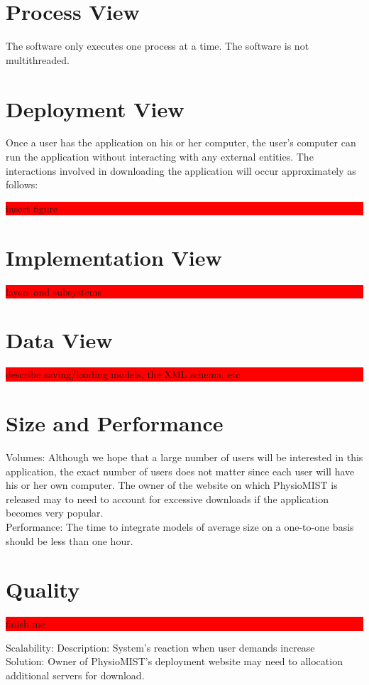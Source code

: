 \documentclass{article}
\newcommand{\todo}[1]{\colorbox{red}{\begin{minipage}{\textwidth}{#1}\end{minipage}}}
\begin{document}
\section{Process View}
The software only executes one process at a time. The software is not multithreaded.

\section{Deployment View}
Once a user has the application on his or her computer, the user's computer can run the application without interacting with any external entities.
The interactions involved in downloading the application will occur approximately as follows:
\todo{insert figure} 

\section{Implementation View}
\todo{layers and subsystems}

\section{Data View}
\todo{describe saving/loading models, the XML schema, etc}

\section{Size and Performance}
Volumes:
\newline
Although we hope that a large number of users will be interested in this application, the exact number of users does not matter since each user will have his or her own computer.  The owner of the website on which PhysioMIST is released may to need to account for excessive downloads if the application becomes very popular.\\
Performance:
\newline
The time to integrate models of average size on a one-to-one basis should be less than one hour.

\section{Quality}
\todo{finish me}
Scalability:
\newline
Description:  System's reaction when user demands increase\\
Solution:  Owner of PhysioMIST's deployment website may need to allocation additional servers for download.
\end{document}
